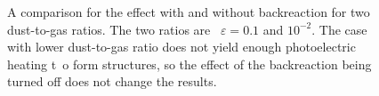 \documentclass[onecolumn]{report}
\begin{document}
\begin{figure}
  \begin{center}
  \end{center}
  \caption{A comparison for the effect with and without backreaction for two dust-to-gas ratios. The two ratios are \
    $\varepsilon=0.1$ and $10^{-2}$. The case with lower dust-to-gas ratio does not yield enough photoelectric heating t\
    o form structures, so the effect of the backreaction being turned off does not change the results.}
  \label{fig:bkrk_comp_two_epsi}
\end{figure}
\end{document}
